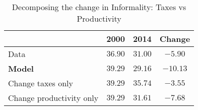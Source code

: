 \documentclass[12pt]{article}
\begin{document}
 \begin{table}[h]
 \caption{Decomposing the change in Informality: Taxes vs Productivity}
 \begin{center}
 \label{results1}
 \begin{tabular}{lccc}
  \hline
  & \textbf{2000} & \textbf{2014} & \textbf{Change} \\ \hline
  Data                     &  $36.90$ & $31.00$ & $-5.90$ \\ 
  \textbf{Model}          &  $39.29$ & $29.16$ & $-10.13$ \\ 
  Change taxes only        &  $39.29$ & $35.74$ & $-3.55$ \\ 
  Change productivity only &  $39.29$ & $31.61$ & $-7.68$ \\ 
 \hline
 \end{tabular}
 \end{center}
 \end{table}
 
\end{document}

